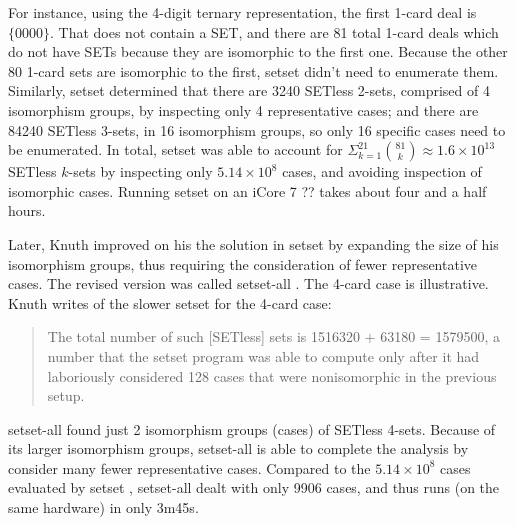 \documentclass[10pt]{amsart}
\newcommand{\SETSET}{  {\sc setset} }
\newcommand{\SETSETA}{ {\sc setset-all} }
\begin{document}
For instance, using the 4-digit ternary representation, the first 1-card deal is
$\{0000\}$. That does not contain a SET, and there are 81 total 1-card deals
which do not have SETs because they are isomorphic to the first one. Because the
other 80 1-card sets are isomorphic to the first, \SETSET didn't need to enumerate
them. Similarly, \SETSET determined that there are 3240 SETless 2-sets, comprised of
4 isomorphism groups, by inspecting only 4 representative cases; and there are
84240 SETless 3-sets, in 16 isomorphism groups, so only 16 specific cases need
to be enumerated. In total, \SETSET was able to account for
$\Sigma_{k=1}^{21}\binom{81}{k}\approx 1.6\times 10^{13}$ SETless $k$-sets by
inspecting only $5.14\times 10^8$ cases, and avoiding inspection of isomorphic
cases. Running \SETSET on an iCore 7 ?? takes about four and a half hours. 


Later, Knuth improved on his the solution in \SETSET by expanding the size of
his isomorphism groups, thus requiring the consideration of fewer representative
cases. The revised version was called \SETSETA\cite{SETSET-ALL}.  The 4-card
case is illustrative. Knuth writes of the slower \SETSET for the 4-card case:
\begin{quote}
  The total number of such [SETless] sets is 1516320 + 63180 = 1579500, a number
  that the \SETSET program was able to compute only after it had laboriously
  considered 128 cases that were nonisomorphic in the previous setup.
\end{quote}
\SETSETA found just 2 isomorphism groups (cases) of SETless 4-sets. Because of
its larger isomorphism groups, \SETSETA is able to complete the analysis by
consider many fewer representative cases. Compared to the $5.14\times 10^8$
cases evaluated by \SETSET, \SETSETA dealt with only 9906 cases, and thus runs
(on the same hardware) in only 3m45s.

\end{document}
